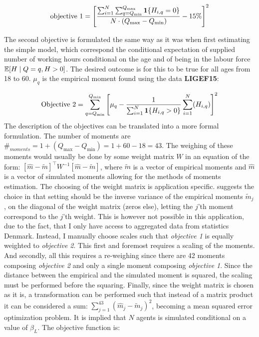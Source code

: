 \begin{equation}
    \text{objective 1} = \left[\frac{\sum_{i=1}^{N} \sum_{q=Q_{\min}}^{Q_{\max}} \mathbf{1}\{H_{i,q} = 0\}}{ N \cdot (Q_{\max} - Q_{\min} )} - 15\% \right]^2
\end{equation}

The second objective is formulated the same way as it was when first estimating the simple model, which correspond the conditional expectation of supplied number of working hours conditional on the age and of being in the labour force $ \mathbb{E}[H \mid Q=q, H>0]$. The desired outcome is for this to be true for all ages from 18 to 60. $\mu_q$ is the empirical moment found using the data \textbf{LIGEF15}:

\begin{equation}
    \text{Objective 2} = \sum_{q=Q_{\min}}^{Q_{\min}} \left[ \mu_q  - \frac{1}{\sum_{i=1}^{N} \mathbf{1}\{H_{i,q} > 0\}}\sum_{i=1}^N (H_{i,q})\right]^2
\end{equation}
The description of the objectives can be translated into a more formal formulation. The number of moments are $\#_{moments} = 1 + (Q_{\max} - Q_{\min}) = 1 + 60 - 18 = 43$. The weighing of these moments would usually be done by some weight matrix $W$ in an equation of the form: $[\hat{m} - \tilde{m}]^{\top} W^{-1} [\hat{m} - \tilde{m}]$, where $\tilde{m}$ is a vector of empirical moments and $\hat{m}$ is a vector of simulated moments allowing for the methods of moments estimation. The choosing of the weight matrix is application specific. \textcite{eisenhauer_estimation_2015} suggests the choice in that setting should be the inverse variance of the empirical moments $\tilde{m}_j$, on the diagonal of the weight matrix (zeros else), letting the $j$'th moment correspond to the $j$'th weight. This is however not possible in this application, due to the fact, that I only have access to aggregated data from statistics Denmark. Instead, I manually choose scales such that \textit{objective 1} is equally weighted to \textit{objective 2}. This first and foremost requires a scaling of the moments. And secondly, all this requires a re-weighing since there are 42 moments composing \textit{objective 2} and only a single moment composing \textit{objective 1}. Since the distance between the empirical and the simulated moment is squared, the scaling must be performed before the squaring. Finally, since the weight matrix is chosen as it is, a transformation can be performed such that instead of a matrix product it can be considered a sum: $\sum_{j = 1}
^{43} ( \hat{m}_j - \tilde{m}_j )^2$, becoming a mean squared error optimization problem. It is implied that $N$ agents is simulated conditional on a value of $\beta_L$. The objective function is:


